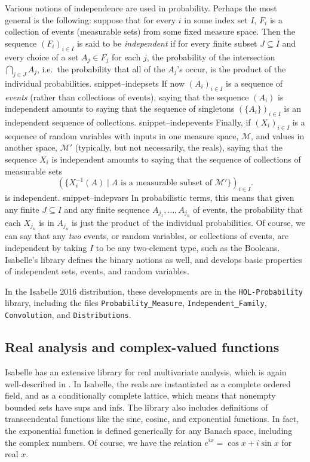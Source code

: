 \documentclass{svjour3}
\newcommand{\mdl}[1]{{\mathcal #1}} %
\newcommand{\Snippet}[1]{\csname snippet--#1\endcsname}
\begin{document}
Various notions of independence are used in probability. Perhaps the most general is the following: suppose that for every $i$ in some index set $I$, $F_i$ is a collection of events (measurable sets) from some fixed measure space. Then the sequence $(F_i)_{i \in I}$ is said to be \emph{independent} if for every finite subset $J \subseteq I$ and every choice of a set $A_j \in F_j$ for each $j$, the probability of the intersection $\bigcap_{j \in J} A_j$, i.e.~the probability that all of the $A_j$'s occur, is the product of the individual probabilities.
\Snippet{indepsets}
If now $(A_i)_{i \in I}$ is a sequence of \emph{events} (rather than collections of events), saying that the sequence $(A_i)$ is independent amounts to saying that the sequence of singletons $(\{A_i\})_{i \in I}$ is an independent sequence of collections.
\Snippet{indepevents}
Finally, if $(X_i)_{i \in I}$ is a sequence of random variables with inputs in one measure space, $\mdl M$, and values in another space, $\mdl M'$ (typically, but not necessarily, the reals), saying that the sequence $X_i$ is independent amounts to saying that the sequence of collections of measurable sets
\[
(\{ X_i^{-1}(A) \; | \; \mbox{$A$ is a measurable subset of $\mdl M'$}\})_{i \in I}.
\]
is independent.
\Snippet{indepvars}
In probabilistic terms, this means that given any finite $J \subseteq I$ and any finite sequence $A_{j_1}, \ldots, A_{j_n}$ of events, the probability that each $X_{j_u}$ is in $A_{j_u}$ is just the product of the individual probabilities. Of course, we can say that any \emph{two} events, or random variables, or collections of events, are independent by taking $I$ to be any two-element type, such as the Booleans. Isabelle's library defines the binary notions as well, and develops basic properties of independent sets, events, and random variables.

In the Isabelle 2016 distribution, these developments are in the \texttt{HOL-Probability} library, including the files \texttt{Probability\_Measure}, \texttt{Independent\_Family}, \texttt{Convolution}, and \texttt{Distributions}.

\subsection{Real analysis and complex-valued functions}
\label{subsection:real:analysis}

Isabelle has an extensive library for real multivariate analysis, which is again well-described in \cite{hoelzl:et:al:13}. In Isabelle, the reals are instantiated as a complete ordered field, and as a conditionally complete lattice, which means that nonempty bounded sets have sups and infs. The library also includes definitions of transcendental functions like the sine, cosine, and exponential functions. In fact, the exponential function is defined generically for any Banach space, including the complex numbers. Of course, we have the relation $e^{i x} = \cos x + i \sin x$ for real $x$.
\end{document}
